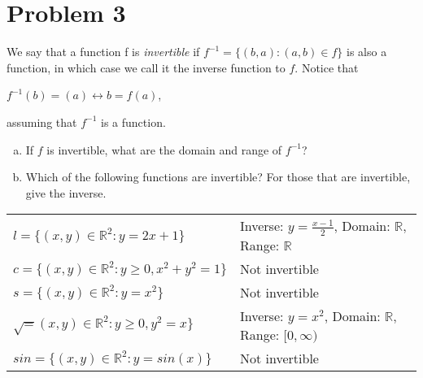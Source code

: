 \documentclass{article}
\begin{document}
\section*{Problem 3}
\begin{flushleft}
We say that a function f is \textit{invertible} if $f^{-1} = \{ (b,a) : (a,b) \in f \}$ is also a function, in which case we call it the inverse function to $f$. Notice that \\
\begin{center}
$f^{-1}(b) = (a) \leftrightarrow b = f(a)$,
\end{center}
assuming that $f^{-1}$ is a function.
\begin{enumerate}[(a)]
\item If $f$ is invertible, what are the domain and range of $f^{-1}$? \\
\item Which of the following functions are invertible? For those that are invertible, give the inverse. \\
\end{enumerate}
\begin{center}
\begin{tabular}{l l}
$l = \{(x,y) \in \mathbb{R}^2 : y = 2x + 1\}$ & Inverse: $y=\frac{x-1}{2}$, Domain: $\mathbb{R}$, Range: $\mathbb{R}$ \\
\vspace{.2cm}
$c = \{(x,y) \in \mathbb{R}^2 : y \geq 0, x^2 + y^2 = 1\}$ & Not invertible \\
\vspace{.2cm}
$s = \{(x,y) \in \mathbb{R}^2 : y = x^2\}$ & Not invertible\\
\vspace{.2cm}
$ \sqrt = (x,y) \in \mathbb{R}^2 : y \geq 0, y^2 = x\}$ & Inverse: $y=x^2$, Domain: $\mathbb{R}$, Range: $[0, \infty)$ \\
\vspace{.2cm}
$sin = \{(x,y) \in \mathbb{R}^2 : y = sin(x)\}$ & Not invertible \\
\end{tabular}
\end{center}
\end{flushleft}
\end{document}

